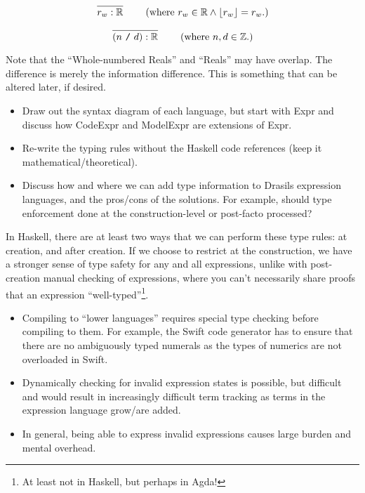 \begin{equation}
      \left.
      \infer{r_w : \bb{R}}{}
      \right.
      \qquad
      \text{(where \(r_w \in \bb{R} \land \lfloor{} r_w \rfloor{} = r_w\).)}
      \label{tr:lit:wholeReal}
\end{equation}

\begin{equation}
      \left.
      \infer{(n\ \texttt{/}\ d) : \bb{R}}{}
      \right.
      \qquad
      \text{(where \(n, d \in \bb{Z}\).)}
      \label{tr:lit:fraction}
\end{equation}

Note that the ``Whole-numbered Reals'' and ``Reals'' may have overlap. The
difference is merely the information difference. This is something that can be
altered later, if desired.


\begin{itemize}
      \item Draw out the syntax diagram of each language, but start with Expr
            and discuss how CodeExpr and ModelExpr are extensions of Expr.

      \item Re-write the typing rules without the Haskell code references (keep
            it mathematical/theoretical).

      \item Discuss how and where we can add type information to Drasils
            expression languages, and the pros/cons of the solutions. For
            example, should type enforcement done at the construction-level or
            post-facto processed?
\end{itemize}

In Haskell, there are at least two ways that we can perform these type rules: at
creation, and after creation. If we choose to restrict at the construction, we
have a stronger sense of type safety for any and all expressions, unlike with
post-creation manual checking of expressions, where you can't necessarily share
proofs that an expression ``well-typed''\footnote{At least not in Haskell, but
      perhaps in Agda!}.

\begin{itemize}

      \item Compiling to ``lower languages'' requires special type checking
            before compiling to them. For example, the Swift code generator has
            to ensure that there are no ambiguously typed numerals as the types
            of numerics are not overloaded in Swift.

      \item Dynamically checking for invalid expression states is possible, but
            difficult and would result in increasingly difficult term tracking
            as terms in the expression language grow/are added.

      \item In general, being able to express invalid expressions causes large
            burden and mental overhead.

\end{itemize}

